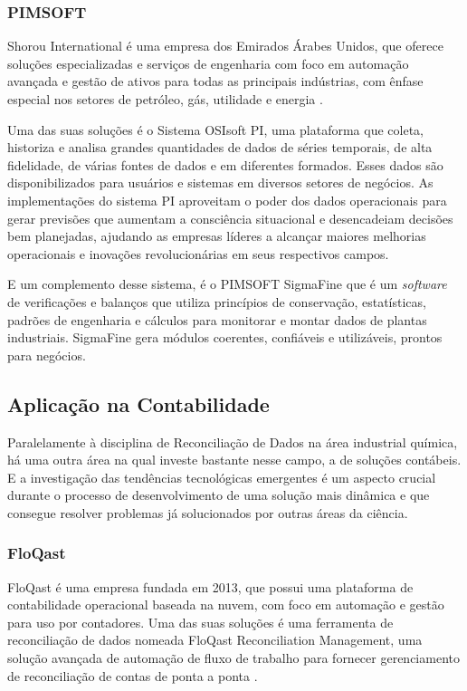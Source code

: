 \subsubsection{PIMSOFT}

Shorou International é uma empresa dos Emirados Árabes Unidos, que oferece soluções especializadas e serviços de engenharia com foco em automação avançada e gestão de ativos para todas as principais indústrias, com ênfase especial nos setores de petróleo, gás, utilidade e energia \cite{pimsoft}.

Uma das suas soluções é o Sistema OSIsoft PI, uma plataforma que coleta, historiza e analisa grandes quantidades de dados de séries temporais, de alta fidelidade, de várias fontes de dados e em diferentes formados. Esses dados são disponibilizados para usuários e sistemas em diversos setores de negócios. As implementações do sistema PI aproveitam o poder dos dados operacionais para gerar previsões que aumentam a consciência situacional e desencadeiam decisões bem planejadas, ajudando as empresas líderes a alcançar maiores melhorias operacionais e inovações revolucionárias em seus respectivos campos. 

E um complemento desse sistema, é o PIMSOFT SigmaFine que é um \textit{software} de verificações e balanços que utiliza princípios de conservação, estatísticas, padrões de engenharia e cálculos para monitorar e montar dados de plantas industriais. SigmaFine gera módulos coerentes, confiáveis e utilizáveis, prontos para negócios.

\subsection{Aplicação na Contabilidade}

Paralelamente à disciplina de Reconciliação de Dados na área industrial química, há uma outra área na qual investe bastante nesse campo, a de soluções contábeis. E a investigação das tendências tecnológicas emergentes é um aspecto crucial durante o processo de desenvolvimento de uma solução mais dinâmica e que consegue resolver problemas já solucionados por outras áreas da ciência.

\subsubsection{FloQast}

FloQast é uma empresa fundada em 2013, que possui uma plataforma  de contabilidade operacional baseada na nuvem, com foco em automação e gestão para uso por contadores. Uma das suas soluções é uma ferramenta de reconciliação de dados nomeada FloQast Reconciliation Management, uma solução avançada de automação de fluxo de trabalho para fornecer gerenciamento de reconciliação de contas de ponta a ponta \cite{floqast}.

